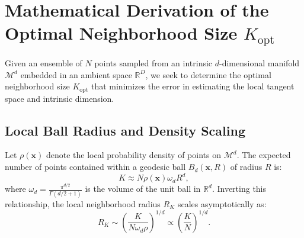 \documentclass[11pt,a4paper]{article}
\begin{document}
\section{Mathematical Derivation of the Optimal Neighborhood Size \texorpdfstring{$K_{\mathrm{opt}}$}{K\_opt}}
\label{sec:heuristic}
Given an ensemble of $N$ points sampled from an intrinsic $d$-dimensional manifold $\mathcal{M}^d$ embedded in an ambient space $\mathbb{R}^D$, we seek to determine the optimal neighborhood size $K_{\mathrm{opt}}$ that minimizes the error in estimating the local tangent space and intrinsic dimension.

\subsection{Local Ball Radius and Density Scaling}
Let $\rho(\mathbf{x})$ denote the local probability density of points on $\mathcal{M}^d$. The expected number of points contained within a geodesic ball $B_d(\mathbf{x}, R)$ of radius $R$ is:
\begin{equation}
    K \approx N \rho(\mathbf{x}) \omega_d R^d,
\end{equation}
where $\omega_d = \frac{\pi^{d/2}}{\Gamma(d/2 + 1)}$ is the volume of the unit ball in $\mathbb{R}^d$. Inverting this relationship, the local neighborhood radius $R_K$ scales asymptotically as:
\begin{equation}
    R_K \sim \left(\frac{K}{N \omega_d \rho}\right)^{1/d} \propto \left(\frac{K}{N}\right)^{1/d}.
    \label{eq:rk_scaling}
\end{equation}
\end{document}
